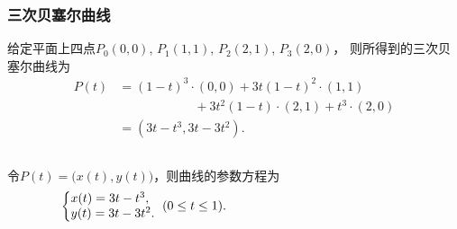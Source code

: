 \documentclass[14pt,notheorems,leqno,xcolor={rgb}]{beamer} %
\begin{document}
\begin{frame}
\frametitle{三次贝塞尔曲线}
\vspace{-0.5em}%
\begin{example}
给定平面上四点$P_0(0,0)$, $P_1(1,1)$, $P_2(2,1)$, $P_3(2,0)$，
则所得到的三次贝塞尔曲线为
\begin{align*}
P(t) &= (1-t)^3\cdot(0,0) + 3t(1-t)^2\cdot(1,1) \\[-0.3em]
&\qquad\qquad\qquad + 3t^2(1-t)\cdot(2,1) + t^3\cdot(2,0) \\[-0.3em]
&= (3t-t^3,3t-3t^2).
\end{align*}\vspace{-1em}\pause
\begin{columns}[onlytextwidth]
令$P(t)=\big(x(t),y(t)\big)$，则曲线的参数方程为
\[ \left\{ \begin{array}{@{}l@{}}
  x(t)=3t-t^3, \\ y(t)=3t-3t^2.
\end{array}\right.\ (0\le t \le 1).\]
\hfill
{}
\end{columns}
\end{example}
\end{frame}
\end{document}
